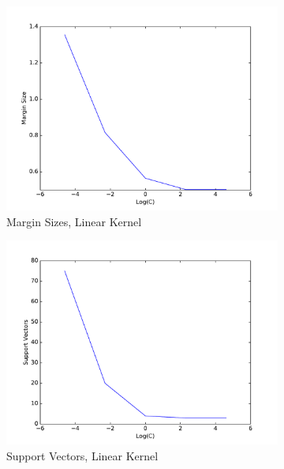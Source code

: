 \documentclass[10pt,psamsfonts]{amsart}
\theoremstyle{definition}
\theoremstyle{remark}
\numberwithin{equation}{section}
\begin{document}
\begin{figure}[b]
	\centering
	\begin{subfigure}[b]{0.23\textwidth}
		\includegraphics[width=\textwidth]{hw2-2_3_linmargins.pdf}
		\caption{Margin Sizes, Linear Kernel}
	\end{subfigure}
	\begin{subfigure}[b]{0.23\textwidth}
		\includegraphics[width=\textwidth]{hw2-2_3_linsv.pdf}
		\caption{Support Vectors, Linear Kernel}
	\end{subfigure}
	\begin{subfigure}[b]{0.23\textwidth}

\end{subfigure}
\end{figure}
\end{document}

